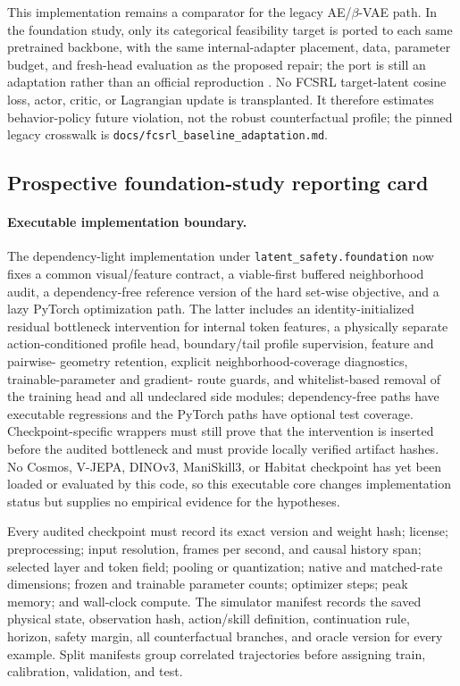 This implementation remains a comparator for the legacy AE/$\beta$-VAE path.  In the foundation
study, only its categorical feasibility target is ported to each same pretrained backbone, with the
same internal-adapter placement, data, parameter budget, and fresh-head evaluation as the proposed
repair; the port is still an adaptation rather than an official reproduction
\citep{cen2024feasibility}.  No FCSRL target-latent cosine loss, actor, critic, or Lagrangian update
is transplanted.  It therefore estimates behavior-policy future violation, not the robust
counterfactual profile; the pinned legacy crosswalk is
\texttt{docs/fcsrl\_baseline\_adaptation.md}.
\endgroup

\subsection{Prospective foundation-study reporting card}

\paragraph{Executable implementation boundary.}
The dependency-light implementation under \texttt{latent\_safety.foundation} now fixes a common
visual/feature contract, a viable-first buffered neighborhood audit, a dependency-free reference
version of the hard set-wise objective, and a lazy PyTorch optimization path.  The latter includes
an identity-initialized residual bottleneck intervention for internal token features, a physically
separate action-conditioned profile head, boundary/tail profile supervision, feature and pairwise-
geometry retention, explicit neighborhood-coverage diagnostics, trainable-parameter and gradient-
route guards, and whitelist-based removal of the training head and all undeclared side modules;
dependency-free paths have executable regressions and the PyTorch paths have optional test coverage.
Checkpoint-specific wrappers must still prove that the intervention is inserted before the audited
bottleneck and must provide locally verified artifact hashes.  No Cosmos, V-JEPA, DINOv3,
ManiSkill3, or Habitat checkpoint has yet been loaded or evaluated by this code, so this executable
core changes implementation status but supplies no empirical evidence for the hypotheses.

Every audited checkpoint must record its exact version and weight hash; license; preprocessing;
input resolution, frames per second, and causal history span; selected layer and token field;
pooling or quantization; native and matched-rate dimensions; frozen and trainable parameter counts;
optimizer steps; peak memory; and wall-clock compute.  The simulator manifest records the saved
physical state, observation hash, action/skill definition, continuation rule, horizon, safety
margin, all counterfactual branches, and oracle version for every example.  Split manifests group
correlated trajectories before assigning train, calibration, validation, and test.

